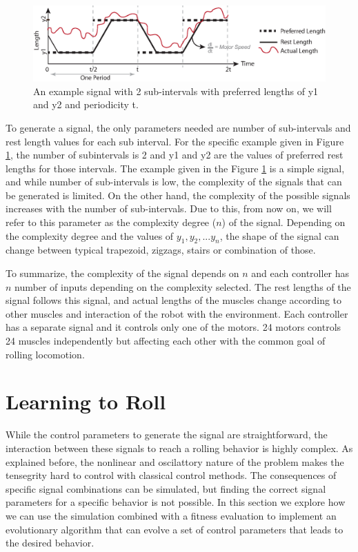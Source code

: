 \documentclass[twocolumn,10pt]{asme2ej}
\begin{document}
\begin{figure}[t]
\centering
\includegraphics[width=\columnwidth]{fig/signal.eps}
\caption{An example signal with 2 sub-intervals with preferred lengths of y1 and y2 and periodicity t.}
\label{fig:signal}
\end{figure}


To generate a signal, the only parameters needed are number of sub-intervals and rest length values for each sub interval. For the specific example given in Figure \ref{fig:signal}, the number of subintervals is 2 and y1 and y2 are the values of preferred rest lengths for those intervals. The example given in the Figure \ref{fig:signal} is a simple signal, and while number of sub-intervals is low, the complexity of the signals that can be generated is limited. On the other hand, the complexity of the possible signals increases with the number of sub-intervals. Due to this, from now on, we will refer to this parameter as the complexity degree  ($n$) of the signal. Depending on the complexity degree and the values of $y_1,y_2,...y_n$, the shape of the signal can change between typical trapezoid, zigzags, stairs or combination of those. 

To summarize, the complexity of the signal depends on $n$ and each controller has $n$ number of inputs depending on the complexity selected. The rest lengths of the signal follows this signal, and actual lengths of the muscles change according to other muscles and interaction of the robot with the environment. Each controller has a separate signal and it controls only one of the motors. 24 motors controls 24 muscles independently but affecting each other with the common goal of rolling locomotion.



\section{Learning to Roll}
\label{sec:learning}



While the control parameters  to generate the signal are straightforward, the interaction between these signals to reach a rolling behavior is highly complex. As explained before, the  nonlinear and oscilattory nature of the problem makes the tensegrity hard to control with classical control methods. The consequences of specific signal combinations can be simulated, but finding the correct signal parameters for a specific behavior is not possible. In this section we explore how we can use the simulation combined with a fitness evaluation to implement an evolutionary algorithm that can evolve a set of control parameters that leads to the desired behavior.
\end{document}
